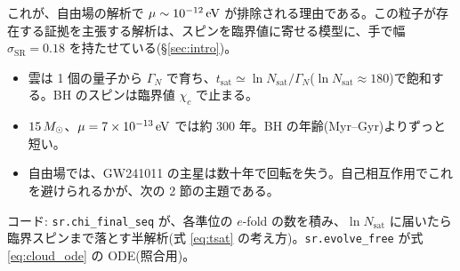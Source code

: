 これが、自由場の解析で $\mu\sim10^{-12}\,\mathrm{eV}$ が排除される理由である。この粒子が存在する証拠を主張する解析は、スピンを臨界値に寄せる模型に、手で幅 $\sigma_\mathrm{SR}=0.18$ を持たせている(\S\ref{sec:intro})。

\begin{summary}
\begin{itemize}
\item 雲は 1 個の量子から $\Gamma_N$ で育ち、$t_\mathrm{sat}\simeq\ln N_\mathrm{sat}/\Gamma_N$($\ln N_\mathrm{sat}\approx180$)で飽和する。BH のスピンは臨界値 $\chi_c$ で止まる。
\item $15\,M_\odot$、$\mu=7\times10^{-13}\,\mathrm{eV}$ では約 300 年。BH の年齢(Myr--Gyr)よりずっと短い。
\item 自由場では、GW241011 の主星は数十年で回転を失う。自己相互作用でこれを避けられるかが、次の 2 節の主題である。
\end{itemize}
\end{summary}

\begin{tocode}
コード: \texttt{sr.chi\_final\_seq} が、各準位の $e$-fold の数を積み、$\ln N_\mathrm{sat}$ に届いたら臨界スピンまで落とす半解析(式 \ref{eq:tsat} の考え方)。\texttt{sr.evolve\_free} が式 \eqref{eq:cloud_ode} の ODE(照合用)。
\end{tocode}
